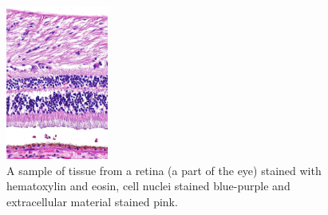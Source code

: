 \documentclass[12pt,a4paper]{report}
\begin{document}
 \begin{figure}
     \centering
     \includegraphics[width = 0.3\textwidth]{images/h&e_retyna}
     \caption{A sample of tissue from a retina (a part of the eye) stained with hematoxylin and eosin, cell nuclei stained blue-purple and extracellular material stained pink.}
     \label{fig:he_retyna}
 \end{figure}
\end{document}

